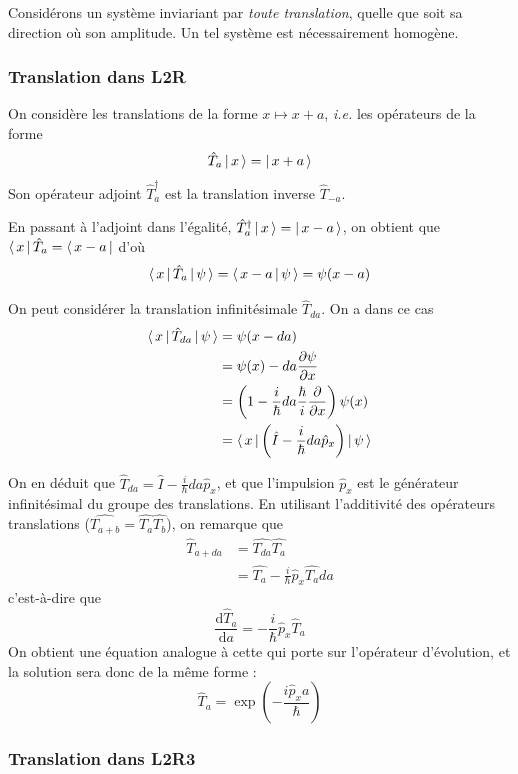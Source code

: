     Considérons un système inviariant par \textit{toute translation}, quelle que soit sa direction où son amplitude. Un tel système est nécessairement homogène. 

        \subsubsection{Translation dans L2R}

    On considère les translations de la forme $x \mapsto x + a$, \textit{i.e.} les opérateurs de la forme 
    \[ \hat{T}_a \left| \, x \, \right> = \left| \, x + a \, \right> \]    
    Son opérateur adjoint $\hat{T}_a^{\dagger}$ est la translation inverse $\hat{T}_{-a}$. 

    En passant à l’adjoint dans l’égalité, $\hat{T}^{\dagger}_{a}\left| \, x \, \right> = \left| \, x-a \, \right>$, on obtient que $\left< \, x \, \right| \hat{T}_a = \left< \, x-a \, \right|$ d’où 
    \[ \left< \, x \, \right| \hat{T}_a \left| \, \psi \, \right> = \left< \, x-a \, \middle| \, \psi \, \right> = \psi(x-a) \] 
    
    On peut considérer la translation infinitésimale $\hat{T}_{da}$. On a dans ce cas 
    \begin{align*}
        \left< \, x \, \right| \hat{T}_{da} \left| \, \psi \, \right> 
        &= \psi(x - da) \\
        &= \psi(x) - da \frac{\partial \psi}{\partial x} \\
        &= \left(1 - \frac{i}{\hbar}da \frac{\hbar}{i}\frac{\partial }{\partial x} \right) \psi(x) \\
        &= \left< \, x \, \right| \left(\hat{I} - \frac{i}{\hbar} da \hat{p}_x \right) \left| \, \psi \, \right>
    \end{align*}

    On en déduit que $\hat{T}_{da} = \hat{I} - \frac{i}{\hbar} da \hat{p}_x$, et que l’impulsion $\hat{p}_x$ est le générateur infinitésimal du groupe des translations. En utilisant l’additivité des opérateurs translations ($\hat{T_{a+b}} = \hat{T_a}\hat{T_b}$), on remarque que 
    \begin{align*}
        \hat{T}_{a + da} 
        &= \hat{T_{da}}\hat{T_a} \\
        &= \hat{T_a} - \frac{i}{\hbar}\hat{p}_x \hat{T_a}da
    \end{align*}
    c’est-à-dire que 
    \[ \frac{\text{d}\hat{T}_a}{\text{d}a} = - \frac{i}{\hbar} \hat{p}_x \hat{T}_a  \]
    On obtient une équation analogue à cette qui porte sur l’opérateur d’évolution, et la solution sera donc de la même forme :
    \[ \hat{T}_a = \exp\left(-\frac{i \hat{p}_x a}{\hbar}\right) \]  
    
        \subsubsection{Translation dans L2R3}

